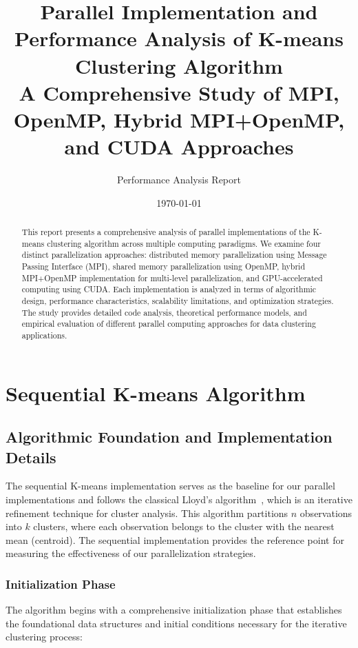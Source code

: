 \documentclass[12pt,a4paper]{article}
\title{\textbf{Parallel Implementation and Performance Analysis of K-means Clustering Algorithm} \\ 
\large A Comprehensive Study of MPI, OpenMP, Hybrid MPI+OpenMP, and CUDA Approaches}
\author{Performance Analysis Report}
\date{\today}
\begin{document}
\maketitle

\begin{abstract}
This report presents a comprehensive analysis of parallel implementations of the K-means clustering algorithm across multiple computing paradigms. We examine four distinct parallelization approaches: distributed memory parallelization using Message Passing Interface (MPI), shared memory parallelization using OpenMP, hybrid MPI+OpenMP implementation for multi-level parallelization, and GPU-accelerated computing using CUDA. Each implementation is analyzed in terms of algorithmic design, performance characteristics, scalability limitations, and optimization strategies. The study provides detailed code analysis, theoretical performance models, and empirical evaluation of different parallel computing approaches for data clustering applications.
\end{abstract}

\tableofcontents
\newpage

\section{Sequential K-means Algorithm}

\subsection{Algorithmic Foundation and Implementation Details}

The sequential K-means implementation serves as the baseline for our parallel implementations and follows the classical Lloyd's algorithm~\cite{lloyd1982}, which is an iterative refinement technique for cluster analysis. This algorithm partitions $n$ observations into $k$ clusters, where each observation belongs to the cluster with the nearest mean (centroid). The sequential implementation provides the reference point for measuring the effectiveness of our parallelization strategies.

\subsubsection{Initialization Phase}

The algorithm begins with a comprehensive initialization phase that establishes the foundational data structures and initial conditions necessary for the iterative clustering process:
\end{document}
